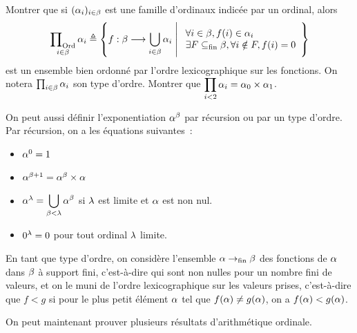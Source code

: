 \begin{exercise}
  Montrer que si $(\alpha_i)_{i\in \beta}$ est une famille d'ordinaux indicée
  par un ordinal, alors
  \[\mathop{\mathbin{\prod}_{\operatorname{Ord}}}_{i \in \beta}
  \alpha_i \triangleq
  \left\{ f : \displaystyle \beta \longrightarrow \bigcup_{i \in \beta}\alpha_i \;\middle\vert\; \begin{array}{l}
            \forall i \in \beta, f(i) \in \alpha_i\\
            \exists F \subseteq_{\mathrm{fin}} \beta, \forall i \notin F, f(i) = 0
        \end{array} \right\}\]
  est un ensemble bien ordonné par l'ordre lexicographique sur les fonctions.
  On notera $\prod_{i\in\beta}\alpha_i$ son type d'ordre. Montrer que
  $\displaystyle\prod_{i < 2}\alpha_i = \alpha_0\times\alpha_1$.
\end{exercise}

On peut aussi définir l'exponentiation $\alpha^\beta$ par récursion ou par un
type d'ordre. Par récursion, on a les équations suivantes~:
\begin{itemize}
\item $\alpha^0 = 1$
\item $\alpha^{\beta+1} = \alpha^\beta \times \alpha$
\item $\alpha^{\lambda} = \displaystyle\bigcup_{\beta < \lambda}\alpha^\beta$
  si $\lambda$ est limite et $\alpha$ est non nul.
\item $0^{\lambda} = 0$ pour tout ordinal $\lambda$ limite.
\end{itemize}
En tant que type d'ordre, on considère l'ensemble $\alpha\to_{\mathrm{fin}}\beta$
des fonctions de $\alpha$ dans $\beta$ à support fini, c'est-à-dire qui sont
non nulles pour un nombre fini de valeurs, et on le muni de l'ordre
lexicographique sur les valeurs prises, c'est-à-dire que $f < g$ si pour le
plus petit élément $\alpha$ tel que $f(\alpha)\neq g(\alpha)$, on a
$f(\alpha) < g(\alpha)$.

On peut maintenant prouver plusieurs résultats d'arithmétique ordinale.


